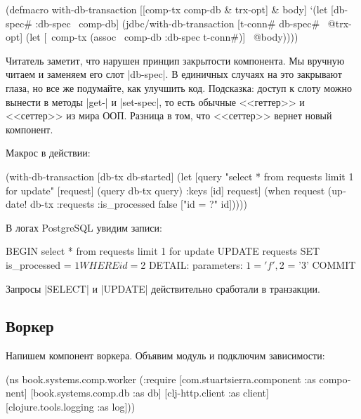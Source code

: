 \begin{english}
  \begin{clojure}
(defmacro with-db-transaction
  [[comp-tx comp-db & trx-opt] & body]
  `(let [{db-spec# :db-spec} ~comp-db]
     (jdbc/with-db-transaction
       [t-conn# db-spec# ~@trx-opt]
       (let [~comp-tx (assoc ~comp-db :db-spec t-conn#)]
         ~@body))))
  \end{clojure}
\end{english}

Читатель заметит, что нарушен принцип закрытости компонента. Мы вручную читаем и
заменяем его слот \spverb|db-spec|. В единичных случаях на это закрывают глаза,
но все же подумайте, как улучшить код. Подсказка: доступ к слоту можно вынести в
методы \spverb|get-| и \spverb|set-spec|, то есть обычные <<геттер>> и
<<сеттер>> из мира ООП. Разница в том, что <<сеттер>> вернет новый компонент.

Макрос в действии:

\begin{english}
  \begin{clojure}
(with-db-transaction
  [db-tx db-started]
  (let [query "select * from requests limit 1 for update"
        [request] (query db-tx query)
        {:keys [id]} request]
    (when request
      (update! db-tx :requests
               {:is_processed false}
               ["id = ?" id]))))
  \end{clojure}
\end{english}

В логах PostgreSQL увидим записи:

\begin{english}
  \begin{sql}
BEGIN
select * from requests limit 1 for update
UPDATE requests SET is_processed = $1 WHERE id = $2
DETAIL:  parameters: $1 = 'f', $2 = '3'
COMMIT
  \end{sql}
\end{english}

Запросы \spverb|SELECT| и \spverb|UPDATE| действительно сработали в транзакции.

\subsection{Воркер}

Напишем компонент воркера. Объявим модуль и подключим зависимости:

\begin{english}
  \begin{clojure}
(ns book.systems.comp.worker
  (:require
   [com.stuartsierra.component :as component]
   [book.systems.comp.db :as db]
   [clj-http.client :as client]
   [clojure.tools.logging :as log]))
  \end{clojure}
\end{english}

